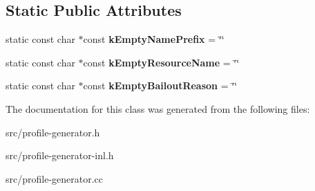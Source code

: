 \subsection*{Static Public Attributes}
\begin{DoxyCompactItemize}
\item 
\hypertarget{classv8_1_1internal_1_1_code_entry_ab7782a3e7e086bb6aef3262f85382bf0}{}static const char $\ast$const {\bfseries k\+Empty\+Name\+Prefix} = \char`\"{}\char`\"{}\label{classv8_1_1internal_1_1_code_entry_ab7782a3e7e086bb6aef3262f85382bf0}

\item 
\hypertarget{classv8_1_1internal_1_1_code_entry_a8252e4f992350bf1a093c275694332cb}{}static const char $\ast$const {\bfseries k\+Empty\+Resource\+Name} = \char`\"{}\char`\"{}\label{classv8_1_1internal_1_1_code_entry_a8252e4f992350bf1a093c275694332cb}

\item 
\hypertarget{classv8_1_1internal_1_1_code_entry_ab3288c79f50d86af34c09214795aa2f2}{}static const char $\ast$const {\bfseries k\+Empty\+Bailout\+Reason} = \char`\"{}\char`\"{}\label{classv8_1_1internal_1_1_code_entry_ab3288c79f50d86af34c09214795aa2f2}

\end{DoxyCompactItemize}


The documentation for this class was generated from the following files\+:\begin{DoxyCompactItemize}
\item 
src/profile-\/generator.\+h\item 
src/profile-\/generator-\/inl.\+h\item 
src/profile-\/generator.\+cc\end{DoxyCompactItemize}

